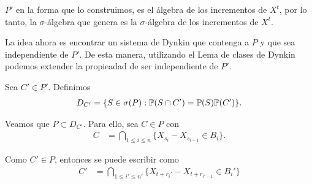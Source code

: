$P'$ en la forma que lo construimos, es el álgebra de los incrementos de $X^t$, por lo tanto, 
la $\sigma$-álgebra que genera es la $\sigma$-álgebra de los incrementos de $X^t$.\pn

La idea ahora es encontrar un sistema de Dynkin que contenga a $P$ y que sea independiente
de $P'$. De esta manera, utilizando el Lema de clases de Dynkin podemos extender la propieadad de ser
independiente de $P'$.\pn

Sea $C' \in P'$. Definimos
\begin{align}
    D_{C'} =   \{ S \in \sigma(P) : \P(S  \cap C') = \P(S) \P(C') \}.
\end{align}\pn

Veamos que $P \subset D_{C'}$. Para ello, sea $C \in P$ con
\begin{align}
     C  &=  \bigcap_{1 \leq i\leq n} \{ X_{s_i} - X_{s_{i-1}} \in B_i \}.
\end{align}\pn

Como $C' \in P$, entonces se puede escribir como
\begin{align}
    C'  &=  \bigcap_{1 \leq i' \leq n'} \{  X_{t + r_i'} - X_{t + r_{i' - 1}} \in B_i' \}
\end{align}

